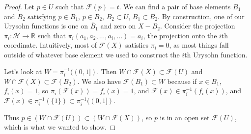 \begin{proof}
	Let $p\in U$ such that $\mathcal{F}(p)=t$.  We can find a pair of base elements $B_1$ and $B_2$ satisfying $p\in B_1$, $p\in B_2$, $\overline{B_2}\subset U$, $\overline{B}_1\subset{B}_2$.  By construction, one of our Urysohn functions is one on $\overline{B}_1$ and zero on $X-{B_2}$.  Consider the projection $\pi_i:\mathcal{H}\rightarrow \mathbb{R}$ such that $\pi_i(a_1,a_2,\dots,a_i,\dots)=a_i$, the projection onto the $i$th coordinate.  Intuitively, most of $\mathcal{F}(X)$ satisfies $\pi_i=0$, as most things fall outside of whatever base element we used to construct the $i$th Urysohn function.
	
	Let's look at $W=\pi_i^{-1}((0,1])$.  Then $W\cap \mathcal{F}(X) \subset \mathcal{F}(U)$ and $W\cap \mathcal{F}(X)\subset \mathcal{F}(B_2)$.  We also have $\mathcal{F}(B_1)\subset W$ because if $x\in B_1$, $f_i(x) = 1$, so $\pi_i(\mathcal{F}(x)) = f_i(x)=1$, and $\mathcal{F}(x)\in \pi_i^{-1}(f_i(x))$, and $\mathcal{F}(x) \in \pi_i^{-1}(\{1\}) \subset \pi_i^{-1}((0,1])$.
	
	Thus $p\in (W\cap \mathcal{F}(U))\subset (W\cap \mathcal{F}(X))$, so $p$ is in an open set $\mathcal{F}(U)$, which is what we wanted to show.

	
	
	
	
	
	
	
\end{proof}